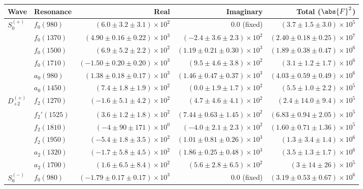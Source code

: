 \begin{table}[ht]
    \begin{center}
        \begin{tabular}{llrrr}\toprule
        Wave & Resonance & Real & Imaginary & Total ($\abs{F}^2$) \\\midrule
$S_{0}^{(+)}$ & $f_{0}(980)$ & $(6.0 \pm 3.2 \pm 3.1) \times 10^{2}$ & $0.0$ (fixed) & $(3.7 \pm 1.5 \pm 3.0) \times 10^{5}$ \\
 & $f_{0}(1370)$ & $(4.90 \pm 0.16 \pm 0.22) \times 10^{3}$ & $(-2.4 \pm 3.6 \pm 2.3) \times 10^{2}$ & $(2.40 \pm 0.18 \pm 0.25) \times 10^{7}$ \\
 & $f_{0}(1500)$ & $(6.9 \pm 5.2 \pm 2.2) \times 10^{2}$ & $(1.19 \pm 0.21 \pm 0.30) \times 10^{3}$ & $(1.89 \pm 0.38 \pm 0.47) \times 10^{6}$ \\
 & $f_{0}(1710)$ & $(-1.50 \pm 0.20 \pm 0.20) \times 10^{3}$ & $(9.5 \pm 4.6 \pm 3.8) \times 10^{2}$ & $(3.1 \pm 1.2 \pm 1.7) \times 10^{6}$ \\
 & $a_{0}(980)$ & $(1.38 \pm 0.18 \pm 0.17) \times 10^{3}$ & $(1.46 \pm 0.47 \pm 0.37) \times 10^{3}$ & $(4.03 \pm 0.59 \pm 0.49) \times 10^{6}$ \\
 & $a_{0}(1450)$ & $(7.4 \pm 1.8 \pm 1.9) \times 10^{2}$ & $(0.0 \pm 1.9 \pm 1.7) \times 10^{2}$ & $(5.5 \pm 1.0 \pm 2.2) \times 10^{5}$ \\
$D_{+2}^{(+)}$ & $f_{2}(1270)$ & $(-1.6 \pm 5.1 \pm 4.2) \times 10^{2}$ & $(4.7 \pm 4.6 \pm 4.1) \times 10^{2}$ & $(2.4 \pm 14.0 \pm 9.4) \times 10^{5}$ \\
 & $f_{2}'(1525)$ & $(3.6 \pm 1.2 \pm 1.8) \times 10^{2}$ & $(7.44 \pm 0.63 \pm 1.45) \times 10^{2}$ & $(6.83 \pm 0.94 \pm 2.05) \times 10^{5}$ \\
 & $f_{2}(1810)$ & $(-4 \pm 90 \pm 171) \times 10^{0}$ & $(-4.0 \pm 2.1 \pm 2.3) \times 10^{2}$ & $(1.60 \pm 0.71 \pm 1.36) \times 10^{5}$ \\
 & $f_{2}(1950)$ & $(-5.4 \pm 1.8 \pm 3.5) \times 10^{2}$ & $(1.01 \pm 0.81 \pm 0.26) \times 10^{3}$ & $(1.3 \pm 3.4 \pm 1.4) \times 10^{6}$ \\
 & $a_{2}(1320)$ & $(-1.7 \pm 5.8 \pm 4.5) \times 10^{2}$ & $(1.86 \pm 0.25 \pm 0.48) \times 10^{3}$ & $(3.5 \pm 1.3 \pm 1.7) \times 10^{6}$ \\
 & $a_{2}(1700)$ & $(1.6 \pm 6.5 \pm 8.4) \times 10^{2}$ & $(5.6 \pm 2.8 \pm 6.5) \times 10^{2}$ & $(3 \pm 14 \pm 26) \times 10^{5}$ \\
$S_{0}^{(-)}$ & $f_{0}(980)$ & $(-1.79 \pm 0.17 \pm 0.17) \times 10^{3}$ & $0.0$ (fixed) & $(3.19 \pm 0.53 \pm 0.67) \times 10^{6}$ \\

\end{tabular}
\end{center}
\end{table}
